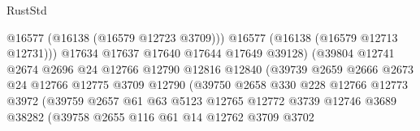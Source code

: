 \begin{lexlean}{RustStd}
\begin{coremodule}
                                          @16577
                                          (@16138 (@16579 @12723 @3709)))
                                        @16577
                                        (@16138 (@16579 @12713 @12731)))
                                      @17634
                                      @17637
                                      @17640
                                      @17644
                                      @17649
                                      @39128)
                                    (@39804
                                      @12741
                                      @2674
                                      @2696
                                      @24
                                      @12766
                                      @12790
                                      @12816
                                      @12840
                                      (@39739
                                        @2659
                                        @2666
                                        @2673
                                        @24
                                        @12766
                                        @12775
                                        @3709
                                        @12790
                                        (@39750
                                          @2658
                                          @330
                                          @228
                                          @12766
                                          @12773
                                          @3972
                                          (@39759
                                            @2657
                                            @61
                                            @63
                                            @5123
                                            @12765
                                            @12772
                                            @3739
                                            @12746
                                            @3689
                                            @38282
                                            (@39758
                                              @2655
                                              @116
                                              @61
                                              @14
                                              @12762
                                              @3709
                                              @3702

\end{coremodule}
\end{lexlean}
